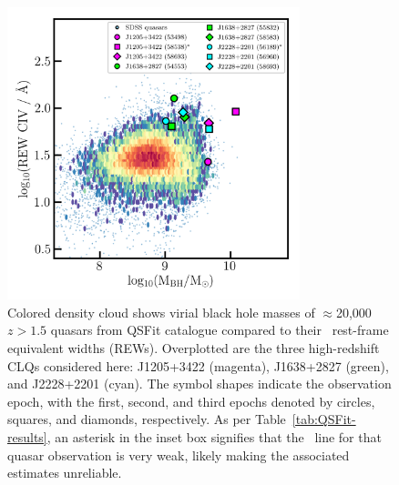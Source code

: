 \documentclass[fleqn,usenatbib]{mnras}
\begin{document}
\begin{figure}
  \centering
  \includegraphics[width=8.5cm, trim=0.2cm 0.2cm 0.0cm 0.2cm, clip]
  {figures/CIV_CLQs_MBHvsREW_20200519.png}
   \vspace{-12pt}
   \caption[]{
     Colored density cloud shows virial black hole masses of
     $\approx$20,000 $z>1.5$ quasars from QSFit catalogue
     \citep{Calderone2017} compared to their \civ\ rest-frame equivalent
     widths (REWs).  Overplotted are the three high-redshift CLQs
     considered here: J1205+3422 (magenta), J1638+2827 (green), and
     J2228+2201 (cyan).  The symbol shapes indicate the observation epoch,
     with the first, second, and third epochs denoted by circles, squares,
     and diamonds, respectively. As per Table~\ref{tab:QSFit-results}, an
     asterisk in the inset box signifies that the \civ\ line for that
     quasar observation is very weak, likely making the associated
     estimates unreliable.}
   \label{fig:CIV_MBHvsREW}
\end{figure}
\end{document}
